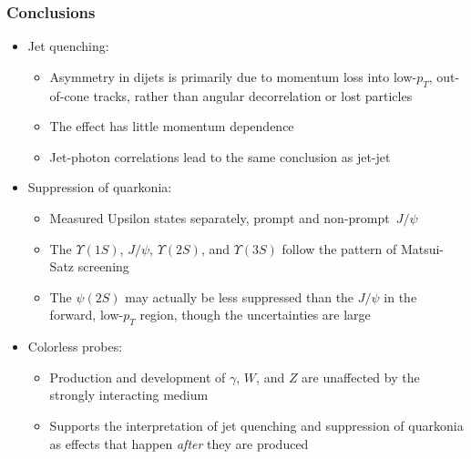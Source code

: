 \documentclass[compress]{beamer}
\begin{document}
\begin{frame}
\frametitle{Conclusions}

\begin{itemize}
\item Jet quenching:
\begin{itemize}
\item Asymmetry in dijets is primarily due to momentum loss into low-$p_T$, out-of-cone tracks, rather than angular decorrelation or lost particles
\item The effect has little momentum dependence
\item Jet-photon correlations lead to the same conclusion as jet-jet
\end{itemize}

\item Suppression of quarkonia:
\begin{itemize}
\item Measured Upsilon states separately, prompt and \mbox{non-prompt $J/\psi$\hspace{-1 cm}}
\item The $\Upsilon(1S)$, $J/\psi$, $\Upsilon(2S)$, and $\Upsilon(3S)$ follow the pattern of Matsui-Satz screening
\item The $\psi(2S)$ may actually be less suppressed than the $J/\psi$ in the forward, low-$p_T$ region, though the uncertainties are large
\end{itemize}

\item Colorless probes:
\begin{itemize}
\item Production and development of $\gamma$, $W$, and $Z$ are unaffected by the strongly interacting medium
\item Supports the interpretation of jet quenching and suppression of quarkonia as effects that happen {\it after} they are produced
\end{itemize}

\end{itemize}

\label{numpages}
\end{frame}
\end{document}
